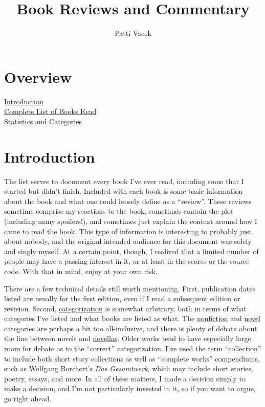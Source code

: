 \documentclass[12pt]{article}
\title{Book Reviews and Commentary}
\author{Patti Vacek}
\begin{document}
\maketitle

\section*{Overview}
\hyperref[sec:intro]{Introduction} \dotfill \pageref{sec:intro}
\\\indent\hyperref[sec:toc]{Complete List of Books Read} \dotfill \pageref{sec:toc}
\\\indent\hyperref[sec:statistics]{Statistics and Categories} \dotfill \pageref{sec:statistics}


\section*{Introduction} \label{sec:intro}

The list serves to document every book I've ever read, including some that I started but didn't finish. Included with each book is some basic information about the book and what one could loosely define as a ``review''. These reviews sometime comprise my reactions to the book, sometimes contain the plot (including many spoilers!), and sometimes just explain the context around how I came to read the book. This type of information is interesting to probably just about nobody, and the original intended audience for this document was solely and singly myself. At a certain point, though, I realized that a limited number of people may have a passing interest in it, or at least in the scores or the source code. With that in mind, enjoy at your own risk.

There are a few technical details still worth mentioning. First, publication dates listed are usually for the first edition, even if I read a subsequent edition or revision. Second, \hyperref[sec:finished_category]{categorization} is somewhat arbitrary, both in terms of what categories I've listed and what books are listed as what. The \hyperref[category:nonfiction]{nonfiction} and \hyperref[category:novel]{novel} categories are perhaps a bit too all-inclusive, and there is plenty of debate about the line between novels and \hyperref[category:novella]{novellas}. Older works tend to have especially large room for debate as to the ``correct'' categorization. I've used the term ``\hyperref[category:collection]{collection}'' to include both short story collections as well as ``complete works'' compendiums, such as \hyperref[sec:Wolfgang Borchert]{Wolfgang Borchert}'s \textit{\hyperref[sec:Das Gesamtwerk]{Das Gesamtwerk}}, which may include short stories, poetry, essays, and more. In all of these matters, I made a decision simply to make a decision, and I'm not particularly invested in it, so if you want to argue, go right ahead.
\end{document}
